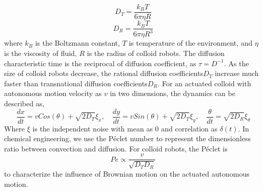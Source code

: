 \begin{equation}
    D_T=\frac{k_B T}{6 \pi \eta R }
\end{equation}
\begin{equation}
    D_R=\frac{k_B T}{6 \pi \eta R^3 }
\end{equation}
where $k_B$ is the Boltzmann constant, $T$ is temperature of the environment, and $\eta$ is the viscosity of fluid, $R$ is the radius of colloid robots. The diffusion characteristic time is the 
reciprocal of diffusion coefficient, as  $\tau=D^{-1}$. As the size of colloid robots decrease, the rational diffusion coefficients$D_T$ increase much faster than transnational diffusion coefficients$D_R$. For an actuated colloid with autonomous motion velocity as $v$ in two dimensions, the dynamics can be described as,
\begin{equation}
    \frac{dx}{dt}=v Cos(\theta)+\sqrt{2 D_T}\xi_x, \quad \frac{dy}{dt}=v Sin(\theta)+\sqrt{2 D_T}\xi_y,\quad
    \frac{\theta}{dt}=\sqrt{2 D_R}\xi_\theta
\end{equation}
Where $\xi$ is the independent noise with mean as $0$ and correlation as $\delta(t)$. In chemical engineering, we use the Péclet number to represent the dimensionless ratio between convection  and diffusion. For colloid robots, the Péclet is 
\begin{equation}
    Pe\propto\frac{v}{\sqrt{D_T D_R}}
\end{equation}
to characterize the influence of Brownian motion on the actuated autonomous motion.

